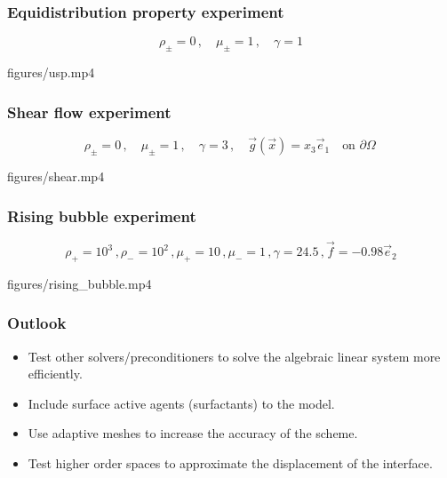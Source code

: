 \documentclass{beamer}
\begin{document}
\begin{frame}
\frametitle{Equidistribution property experiment}

\begin{equation*}
\rho_\pm = 0\,,\quad \mu_\pm = 1\,,\quad \gamma = 1
\end{equation*}

\centering

{figures/usp.mp4}

\end{frame}

\begin{frame}
\frametitle{Shear flow experiment}

\begin{equation*}
\rho_\pm = 0\,,\quad \mu_\pm = 1\,,\quad \gamma = 3\,,\quad
\vec g(\vec x) = x_3\vec e_1\quad \mbox{on }\partial\Omega\,
\end{equation*}

\centering

{figures/shear.mp4}

\end{frame}

\begin{frame}
\frametitle{Rising bubble experiment}

\begin{equation*}
\rho_+ = 10^3\,, \rho_- = 10^2\,, \mu_+ = 10\,, \mu_- = 1\,, \gamma = 24.5\,,
\vec f = -0.98\vec e_2
\end{equation*}

\centering

{figures/rising_bubble.mp4}

\end{frame}

\begin{frame}
\frametitle{Outlook}

\begin{itemize}
\item Test other solvers/preconditioners to solve the algebraic linear system
more efficiently.
\item Include surface active agents (surfactants) to the model.
\item Use adaptive meshes to increase the accuracy of the scheme.
\item Test higher order spaces to approximate the displacement of the interface.
\end{itemize}
\end{frame}
\end{document}
